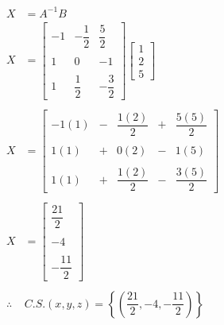 \documentclass[11pt, a4paper]{article}
\begin{document}
\begin{multicols*}{2}
  \begin{align*}
    X &= A^{-1}B\\
    X &= \begin{bmatrix}
      -1 & -\dfrac{1}{2} & \dfrac{5}{2}\\\\
      1 & 0 & -1\\\\
      1 & \dfrac{1}{2} & -\dfrac{3}{2}
    \end{bmatrix}\begin{bmatrix}
      1\\
      2\\
      5
    \end{bmatrix}\\\\
    X &= \begin{bmatrix}
      -1\left(1\right)&-&\dfrac{1\left(2\right)}{2}&+&\dfrac{5\left(5\right)}{2}\\\\
      1\left(1\right)&+&0\left(2\right)&-&1\left(5\right)\\\\
      1\left(1\right)&+&\dfrac{1\left(2\right)}{2}&-&\dfrac{3\left(5\right)}{2}
    \end{bmatrix}\\\\
    X &= \begin{bmatrix}
      \dfrac{21}{2}\\\\
      -4\\\\
      -\dfrac{11}{2}
    \end{bmatrix}\\\\
    \therefore \ &C.S. \left(x,y,z\right) = \left\{\left(\dfrac{21}{2},-4,-\dfrac{11}{2}\right)\right\}
  \end{align*}
\end{multicols*}
\newpage
\end{document}
